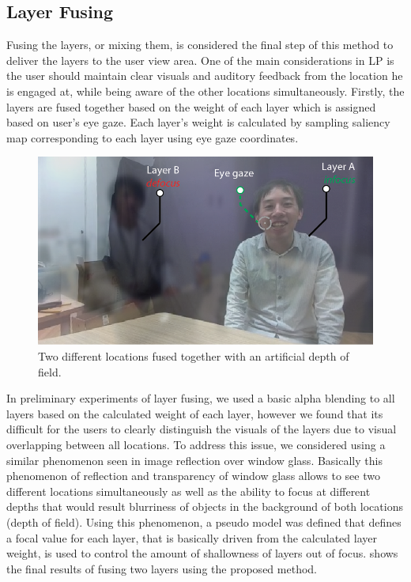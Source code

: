 \subsection{Layer Fusing}
Fusing the layers, or mixing them, is considered the final step of this method to deliver the layers to the user view area. One of the main considerations in LP is the user should maintain clear visuals and auditory feedback from the location he is engaged at, while being aware of the other locations simultaneously. Firstly, the layers are fused together based on the weight of each layer which is assigned based on user's eye gaze. Each layer's weight is calculated by sampling saliency map corresponding to each layer using eye gaze coordinates. 


\begin{figure}[htpb]
  \centering
  \captionsetup{justification=centering}
  \includegraphics[width=1\linewidth]{figures/eval/Layered/fusing.png}
  \caption{Two different locations fused together with an artificial depth of field.}
  \label{fig:LP-fusing}
\end{figure}

In preliminary experiments of layer fusing, we used a basic alpha blending to all layers based on the calculated weight of each layer, however we found that its difficult for the users to clearly distinguish the visuals of the layers due to visual overlapping between all locations. To address this issue, we considered using a similar phenomenon seen in image reflection over window glass. Basically this phenomenon of reflection and transparency of window glass allows to see two different locations simultaneously as well as the ability to focus at different depths that would result blurriness of objects in the background of both locations (depth of field). Using this phenomenon, a pseudo model was defined that defines a focal value for each layer, that is basically driven from the calculated layer weight, is used to control the amount of shallowness of layers out of focus.  shows the final results of fusing two layers using the proposed method.

